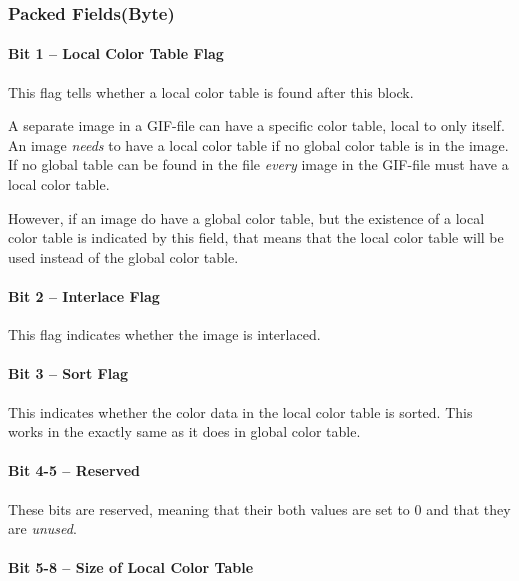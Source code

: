 \begin{refsection}
  \subsubsection{Packed Fields(Byte)}

  \paragraph{Bit 1 -- Local Color Table Flag}

  This flag tells whether a local color table is found after this
  block.

  A separate image in a GIF-file can have a specific color table,
  local to only itself. An image \textit{needs} to have a local color
  table if no global color table is in the image. If no global table
  can be found in the file \textit{every} image in the GIF-file must
  have a local color table.

  However, if an image do have a global color table, but the existence
  of a local color table is indicated by this field, that means that
  the local color table will be used instead of the global color
  table.

  \paragraph{Bit 2 -- Interlace Flag}

  This flag indicates whether the image is interlaced.


  \paragraph{Bit 3 -- Sort Flag}

  This indicates whether the color data in the local color table is
  sorted. This works in the exactly same as it does in global color
  table.

  \paragraph{Bit 4-5 -- Reserved}

  These bits are reserved, meaning that their both values are set to
  $0$ and that they are \textit{unused}.

  \paragraph{Bit 5-8 -- Size of Local Color Table}


\end{refsection}
